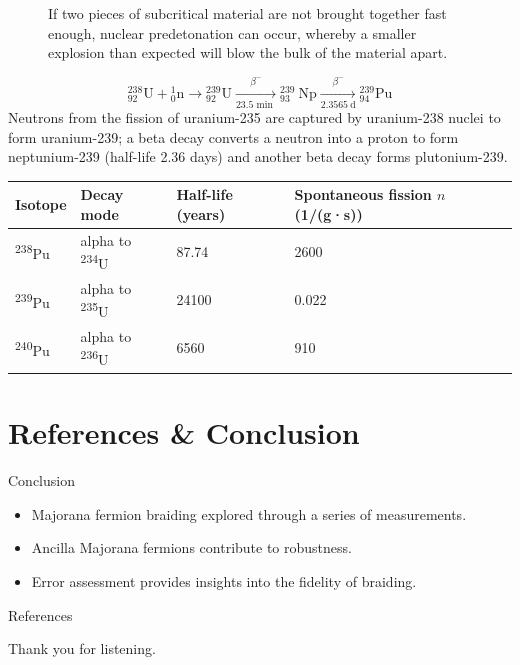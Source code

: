 \documentclass{loyola-beamer}
\begin{document}
\begin{frame}
	\begin{figure}
		
		\caption{If two pieces of subcritical material are not brought together fast enough, nuclear predetonation can occur, whereby a smaller explosion than expected will blow the bulk of the material apart.}
	\end{figure}
\end{frame}

\begin{frame}
	\begin{equation*}
		{ }_{92}^{238} \mathrm{U}+{ }_0^1 \mathrm{n} \longrightarrow{ }_{92}^{239} \mathrm{U} \xrightarrow[23.5 \text { min }]{\beta^{-}}{ }_{93}^{239} \mathrm{~Np} \xrightarrow[2.3565 \mathrm{~d}]{\beta^{-}}{ }_{94}^{239} \mathrm{Pu}
	\end{equation*}
	\vfill
	Neutrons from the fission of uranium-235 are captured by uranium-238 nuclei to form uranium-239; a beta decay converts a neutron into a proton to form neptunium-239 (half-life 2.36 days) and another beta decay forms plutonium-239.\cite{Greenwood1997}
\end{frame}

\begin{frame}
	\begin{tabular}{|l|l|l|l|}
		\hline
		Isotope                 & Decay mode                      & Half-life (years) & Spontaneous fission $n$ (1/(g·s)) \\
		\hline
		\textsuperscript{238}Pu & alpha to \textsuperscript{234}U & 87.74             & 2600                              \\
		\hline
		\textsuperscript{239}Pu & alpha to \textsuperscript{235}U & 24100             & 0.022                             \\
		\hline
		\textsuperscript{240}Pu & alpha to \textsuperscript{236}U & 6560              & 910                               \\
		\hline
	\end{tabular}
\end{frame}

\section{References \& Conclusion}

\begin{frame}{Conclusion}
	\begin{itemize}
		\item Majorana fermion braiding explored through a series of measurements.
		\item Ancilla Majorana fermions contribute to robustness.
		\item Error assessment provides insights into the fidelity of braiding.
	\end{itemize}
\end{frame}

\begin{frame}{References}
	
	
\end{frame}

\begin{titleframe}{Thank you for listening.}
\end{titleframe}
\end{document}
